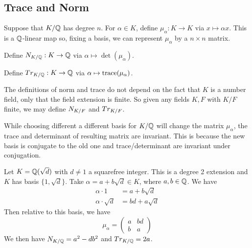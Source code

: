 \subsection{Trace and Norm}

Suppose that $K/\mathbb{Q}$ has degree $n$. For $\alpha \in K$, define $\mu_\alpha: K \to K$ via $x \mapsto \alpha x$. This is a $\mathbb{Q}$-linear map so, fixing a basis, we can represent $\mu_\alpha$ by a $n \times n$ matrix. 

\begin{dfn}[Norm]
Define $N_{K/\mathbb{Q}}: K \to \mathbb{Q}$ via $\alpha \mapsto \det(\mu_\alpha)$. 
\end{dfn}

\begin{dfn}[Trace]
Define $Tr_{K/\mathbb{Q}}: K \to \mathbb{Q}$ via $\alpha \mapsto \operatorname{trace}(\mu_\alpha)$. 
\end{dfn}

\begin{rem}
The definitions of norm and trace do not depend on the fact that $K$ is a number field, only that the field extension is finite. So given any fields $K,F$ with $K/F$ finite, we may define $N_{K/F}$ and $Tr_{K/F}$. 
\end{rem}

\begin{rem}
While choosing different a different basis for $K/\mathbb{Q}$ will change the matrix $\mu_\alpha$, the trace and determinant of resulting matrix are invariant. This is because the new basis is conjugate to the old one and trace/determinant are invariant under conjugation.
\end{rem}

\begin{ex}
Let $K=\mathbb{Q}(\sqrt{d})$ with $d \neq 1$ a squarefree integer. This is a degree 2 extension and $K$ has basis $\{1,\sqrt{d}\}$. Take $\alpha= a+b\sqrt{d} \in K$, where $a,b \in \mathbb{Q}$. We have
	\[
	\begin{split}
	\alpha \cdot 1&= a+b\sqrt{d} \\
	\alpha \cdot \sqrt{d}&= bd+a\sqrt{d}
	\end{split}
	\]
Then relative to this basis, we have
	\[
	\mu_\alpha= \begin{pmatrix} a & bd \\ b & a \end{pmatrix}
	\]
We then have $N_{K/\mathbb{Q}}=a^2-db^2$ and $Tr_{K/\mathbb{Q}}=2a$. \xqed
\end{ex}

